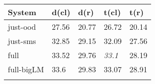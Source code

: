 \begin{tabular}{lllll} \toprule
System & d(cl) & d(r) & t(cl) & t(r) \\
\toprule
just-ood & 27.56 & 20.77 & 26.72 & 20.14 \\
just-sms & 32.85 & 29.15 & 32.09 & 27.56 \\
full & 33.52 & 29.76 & \emph{33.1} & 28.19 \\
full-bigLM & 33.6 & 29.83 & 33.07 & 28.91 \\ 
\bottomrule
\small
\centering
\label{table:baselines}
\end{tabular}
